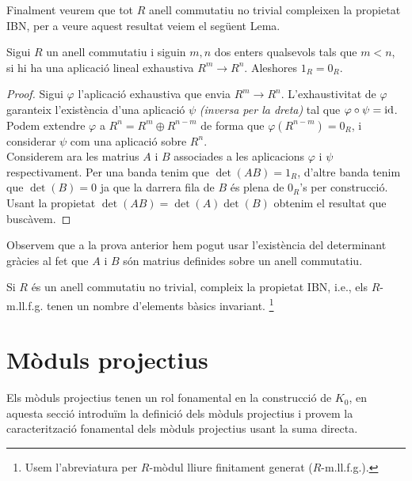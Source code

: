 Finalment veurem que tot $R$ anell commutatiu no trivial  compleixen la propietat IBN, per a veure aquest resultat veiem el següent Lema.

\begin{lemma}
Sigui $R$ un anell commutatiu i siguin $m,n$ dos enters qualsevols tals que $m<n$, si hi ha una aplicació lineal exhaustiva $R^m \rightarrow R^n$. Aleshores $1_R=0_R$.
\end{lemma}
\begin{proof}
Sigui $\varphi$ l'aplicació exhaustiva que envia $R^m \rightarrow R^n$. L'exhaustivitat de $\varphi$ garanteix l'existència d'una aplicació $\psi$ \textit{(inversa per la dreta)} tal que $\varphi \circ \psi = \mathrm{id}$. Podem extendre $\varphi$ a $R^n = R^m \oplus R^{n-m}$ de forma que $\varphi(R^{n-m})=0_R$, i considerar $\psi$ com una aplicació sobre $R^n$. \\
Considerem ara les matrius $A$ i $B$ associades a les aplicacions $\varphi$ i $\psi$ respectivament. Per una banda tenim que $\det (AB) = 1_R$, d'altre banda tenim que $ \det (B)=0$ ja que la darrera fila de $B$ és plena de $0_R$'s per construcció. \\ Usant la propietat $\det(AB)=\det(A)\det(B)$ obtenim el resultat que buscàvem.
\end{proof}
Observem que a la prova anterior hem pogut usar l'existència del determinant gràcies al fet que $A$ i $B$ són matrius definides sobre un anell commutatiu.

\begin{corollary}
Si $R$ és un anell commutatiu no trivial, compleix la propietat IBN, i.e., els $R$-m.ll.f.g. tenen un nombre d'elements bàsics invariant. \footnote{Usem l'abreviatura per $R$-mòdul lliure finitament generat ($R$-m.ll.f.g.).}
\end{corollary}



\section{Mòduls projectius}

Els mòduls projectius tenen un rol fonamental en la construcció de $K_0$, en aquesta secció introduïm la definició dels mòduls projectius i provem la caracterització fonamental dels mòduls projectius usant la suma directa.

